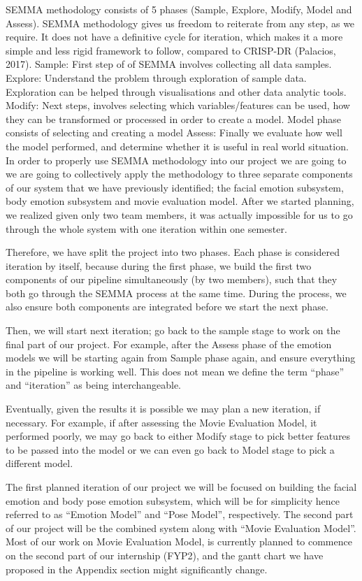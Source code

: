 \documentclass[12pt,a4paper,man]{report}
\begin{document}
SEMMA methodology consists of 5 phases (Sample, Explore, Modify, Model and Assess). SEMMA methodology gives us freedom to reiterate from any step, as we require. It does not have a definitive cycle for iteration, which makes it a more simple and less rigid framework to follow, compared to CRISP-DR (Palacios, 2017). 
Sample:  First step of of SEMMA involves collecting all data samples.
Explore: Understand the problem through exploration of sample data. Exploration can be helped through visualisations and other data analytic tools.
Modify: Next steps, involves selecting which variables/features can be used, how they can be transformed or processed in order to create a model.
Model phase consists of selecting and creating a model
Assess: Finally we evaluate how well the model performed, and determine whether it is useful in real world situation.
In order to properly use SEMMA methodology into our project we are going to we are going to collectively apply the methodology to three separate components of our system that we have previously identified; the facial emotion subsystem, body emotion subsystem and movie evaluation model. After we started planning, we realized given only two team members, it was actually impossible for us to go through the whole system with one iteration within one semester. 

Therefore, we have split the project into two phases. Each phase is considered iteration by itself, because during the first phase, we build the first two components of our pipeline simultaneously (by two members), such that they both go through the SEMMA process at the same time. During the process, we also ensure both components are integrated before we start the next phase.

Then, we will start next iteration; go back to the sample stage to work on the final part of our project. For example, after the Assess phase of the emotion models we will be starting again from Sample phase again, and ensure everything in the pipeline is working well. This does not mean we define the term “phase”  and “iteration” as being interchangeable. 

Eventually, given the results it is possible we may plan a new iteration, if necessary. For example, if after assessing the Movie Evaluation Model, it performed poorly, we may go back to either Modify stage to pick better features to be passed into the model or we can even go back to Model stage to pick a different model.

The first planned iteration of  our project we will be focused on building the facial emotion and body pose emotion subsystem, which will be for simplicity hence referred to as “Emotion Model” and “Pose Model”, respectively. The second part of our project will be the combined system along with “Movie Evaluation Model”. Most of our work on Movie Evaluation Model, is currently planned to commence on the second part of our internship (FYP2), and the gantt chart we have proposed in the Appendix section might significantly change.
\end{document}
